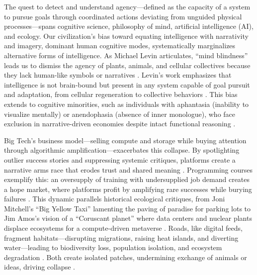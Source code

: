 \documentclass{article}
\begin{document}
The quest to detect and understand agency---defined as the capacity of a system to pursue goals through coordinated actions deviating from unguided physical processes---spans cognitive science, philosophy of mind, artificial intelligence (AI), and ecology. Our civilization’s bias toward equating intelligence with narrativity and imagery, dominant human cognitive modes, systematically marginalizes alternative forms of intelligence. As Michael Levin articulates, ``mind blindness'' leads us to dismiss the agency of plants, animals, and cellular collectives because they lack human-like symbols or narratives \citep{levin2022technological}. Levin's work emphasizes that intelligence is not brain-bound but present in any system capable of goal pursuit and adaptation, from cellular regeneration to collective behaviors \citep{levin2019}. This bias extends to cognitive minorities, such as individuals with aphantasia (inability to visualize mentally) or anendophasia (absence of inner monologue), who face exclusion in narrative-driven economies despite intact functional reasoning \citep{zeman2015,hurlburt2024}.

Big Tech’s business model---selling compute and storage while buying attention through algorithmic amplification---exacerbates this collapse. By spotlighting outlier success stories and suppressing systemic critiques, platforms create a narrative arms race that erodes trust and shared meaning \citep{zuboff2019age,wu2016attention}. Programming courses exemplify this: an oversupply of training with undersupplied job demand creates a hope market, where platforms profit by amplifying rare successes while burying failures \citep{carr2010shallows}. This dynamic parallels historical ecological critiques, from Joni Mitchell’s ``Big Yellow Taxi'' lamenting the paving of paradise for parking lots to Jim Amos’s vision of a ``Coruscant planet'' where data centers and nuclear plants displace ecosystems for a compute-driven metaverse \citep{lanham2006economics}. Roads, like digital feeds, fragment habitats---disrupting migrations, raising heat islands, and diverting water---leading to biodiversity loss, population isolation, and ecosystem degradation \citep{forman2003road}. Both create isolated patches, undermining exchange of animals or ideas, driving collapse \citep{arendt1958human}.
\end{document}
